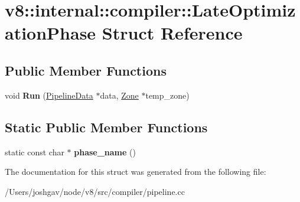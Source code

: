 \hypertarget{structv8_1_1internal_1_1compiler_1_1_late_optimization_phase}{}\section{v8\+:\+:internal\+:\+:compiler\+:\+:Late\+Optimization\+Phase Struct Reference}
\label{structv8_1_1internal_1_1compiler_1_1_late_optimization_phase}
\subsection*{Public Member Functions}
\begin{DoxyCompactItemize}
\item 
void {\bfseries Run} (\hyperlink{classv8_1_1internal_1_1compiler_1_1_pipeline_data}{Pipeline\+Data} $\ast$data, \hyperlink{classv8_1_1internal_1_1_zone}{Zone} $\ast$temp\+\_\+zone)\hypertarget{structv8_1_1internal_1_1compiler_1_1_late_optimization_phase_a0b8bfb2a5de27ba00e224adebae26bc0}{}\label{structv8_1_1internal_1_1compiler_1_1_late_optimization_phase_a0b8bfb2a5de27ba00e224adebae26bc0}

\end{DoxyCompactItemize}
\subsection*{Static Public Member Functions}
\begin{DoxyCompactItemize}
\item 
static const char $\ast$ {\bfseries phase\+\_\+name} ()\hypertarget{structv8_1_1internal_1_1compiler_1_1_late_optimization_phase_a1b09816077947b18580171b4281cc557}{}\label{structv8_1_1internal_1_1compiler_1_1_late_optimization_phase_a1b09816077947b18580171b4281cc557}

\end{DoxyCompactItemize}


The documentation for this struct was generated from the following file\+:\begin{DoxyCompactItemize}
\item 
/\+Users/joshgav/node/v8/src/compiler/pipeline.\+cc\end{DoxyCompactItemize}

